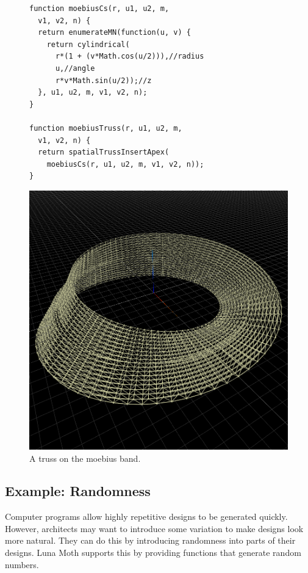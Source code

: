 \begin{figure}
\begin{minipage}{0.5\textwidth}
\begin{verbatim}
function moebiusCs(r, u1, u2, m,
  v1, v2, n) {
  return enumerateMN(function(u, v) {
    return cylindrical(
      r*(1 + (v*Math.cos(u/2))),//radius
      u,//angle
      r*v*Math.sin(u/2));//z
  }, u1, u2, m, v1, v2, n);
}

function moebiusTruss(r, u1, u2, m,
  v1, v2, n) {
  return spatialTrussInsertApex(
    moebiusCs(r, u1, u2, m, v1, v2, n));
}
\end{verbatim}
\end{minipage}%
\begin{minipage}{0.5\textwidth}
  \includegraphics[width=1.0\textwidth]{./images/detail_examples/moebius_truss_crop}
\end{minipage}
\caption{A truss on the moebius band.}
\label{fig:truss:moebius}
\end{figure}


\subsection{Example: Randomness}
Computer programs allow highly repetitive designs to be generated quickly.
However, architects may want to introduce some variation to make designs look more natural.
They can do this by introducing randomness into parts of their designs.
Luna Moth supports this by providing functions that generate random numbers.

